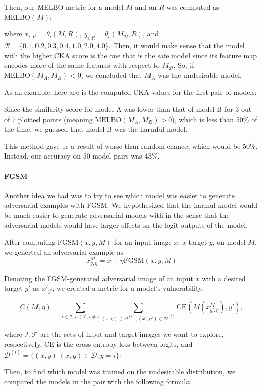 \documentclass[letterpaper]{article} %
\begin{document}
Then, our MELBO metric for a model $M$ and an $R$ was computed as $\text{MELBO}(M)$:


where $x_{i,R}=\theta_i(M,R)$, $y_{i,R}=\theta_i(M_\mathcal{D},R)$, and $\mathcal{R}=\{0.1,0.2,0.3,0.4,1.0,2.0,4.0\}$. Then, it would make sense that the model with the higher CKA score is the one that is the safe model since its feature map encodes more of the same features with respect to $M_\mathcal{D}$. So, if $\text{MELBO}(M_A, M_B) < 0$, we concluded that $M_A$ was the undesirable model.

As an example, here are is the computed CKA values for the first pair of models:


Since the similarity score for model A was lower than that of model B for 3 out of 7 plotted points (meaning $\text{MELBO}(M_A, M_B)>0$), which is less than 50\% of the time, we guessed that model B was the harmful model.

This method gave us a result of worse than random chance, which would be 50\%. Instead, our accuracy on 50 model pairs was 43\%.

\paragraph{FGSM}
Another idea we had was to try to see which model was easier to generate adversarial examples with FGSM. We hypothesized that the harmul model would be much easier to generate adversarial models with in the sense that the adversarial models would have larger effects on the logit outputs of the model.

After computing $\text{FGSM}(x,y,M)$ for an input image $x$, a target $y$, on model $M$, we generted an adversarial example as
$$x_{y,\eta}^M = x + \eta \text{FGSM}(x,y,M)$$

Denoting the FGSM-generated adversarial image of an input $x$ with a desired target $y'$ as $x'_{y'}$, we created a metric for a model's vulnerability:

$$C(M,\eta) = \sum_{i \in \mathcal{I}, t \in \mathcal{T}, i\neq t} \sum_{(x,y)\in \mathcal{D}^{(i)}, (x',y') \in \mathcal{D}^(t)} \text{CE}(M(x_{y',\eta}^M),y'),$$

where $\mathcal{I}, \mathcal{T}$ are the sets of input and target images we want to explore, respectively, $\text{CE}$ is the cross-entropy loss between logits, and $\mathcal{D}^{(i)} = \{(x,y) | (x,y) \in \mathcal{D},  y=i\}$.

Then, to find which model was trained on the undesirable distribution, we compared the models in the pair with the following formula:
\end{document}

